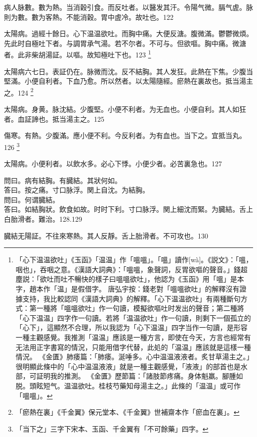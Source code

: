 病人脉數。數为熱。当消穀引食。而反吐者。以醫发其汗。令陽气微。膈气虗。脉則为數。數为客熱。不能消穀。胃中虗冷。故吐也。122

太陽病。過經十餘日。心下温温欲吐。而胸中痛。大便反溏。腹微滿。鬱鬱微煩。先{\khaaitp 此}时自極吐下者。与{\khaaitp 調胃}承气湯。若不尔者。不可与。但欲嘔。胸中痛。微溏者。此非柴胡湯証。以嘔。故知極吐下也。123
	\footnote{
		「心下温温欲吐」《玉函》「温温」作「嗢嗢」。「嗢」讀作[wà]。《説文》：「嗢，咽也」，吞咽之意。《漢語大詞典》：「嗢嗢，象聲詞，反胃欲嘔的聲音。」錢超塵説：「欲吐而吐不暢快的樣子曰嗢嗢欲吐」，他認为《玉函》用「嗢」是本字，趙本作「温」是假借字。
		唐弘宇按：錢老對「嗢嗢欲吐」的解釋沒有證據支持，我比較認同《漢語大詞典》的解釋。「心下温温欲吐」有兩種斷句方式：第一種將「嗢嗢欲吐」作一句讀，模擬欲嘔吐时发出的聲音；第二種將「心下温温」四字作一句讀。若將「温温欲吐」作一句讀，則剩下一個孤立的「心下」，這顯然不合理，所以我認为「心下温温」四字当作一句讀，是形容一種主觀感覺。我推測「温温」應該是一種方言，即使在今天，方言也經常有无法用正字書寫的情況，只能用借字代替，此処的「温温」應該就是這樣一種情況。
		《金匱》肺痿篇：「肺痿。涎唾多。心中温温液液者。炙甘草湯主之。」很明顯此條中的「心中温温液液」就是一種主觀感覺，「液液」的部首也是水部，可証明我的推測。
		《金匱》歷節篇：「諸肢節疼痛。身体魁羸。腳腫如脱。頭眩短气。温温欲吐。桂枝芍藥知母湯主之。」此條的「温温」或可作「嗢嗢」。
	}

太陽病六七日。表証仍在。脉微而沈。反不結胸。其人发狂。此熱在下焦。少腹当堅滿。小便自利者。下血乃愈。所以然者。以太陽隨經。瘀熱在裏故也。抵当湯主之。124
	\footnote{
		「瘀熱在裏」《千金翼》保元堂本、《千金翼》世補齋本作「瘀血在裏」。
	}

太陽病。身黄。脉沈結。少腹堅。小便不利者。为无血也。小便自利。其人如狂者。血証諦也。抵当湯主之。125

傷寒。有熱。少腹滿。應小便不利。今反利者。为有血也。当下之。宜抵当丸。126
	\footnote{
		「当下之」三字下宋本、玉函、千金翼有「不可餘藥」四字。
	}

太陽病。小便利者。以飲水多。必心下悸。小便少者。必苦裏急也。127

問曰。病有結胸。有臓結。其狀何如。\\
答曰。按之痛。寸口脉浮。関上自沈。为結胸。\\
問曰。何谓臓結。\\
答曰。如結胸狀。飲食如故。时时下利。寸口脉浮。関上細沈而緊。为臓結。舌上白胎滑者。難治。128.129

臓結无陽証。不往來寒熱。其人反靜。舌上胎滑者。不可攻也。130

